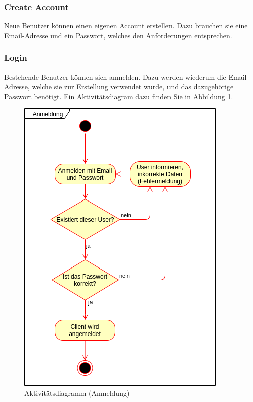 \documentclass[a4paper, titlepage]{article}
\begin{document}
    \subsubsection{Create Account}
    Neue Benutzer können einen eigenen Account erstellen. Dazu
    brauchen sie eine Email-Adresse und ein Passwort, welches
    den Anforderungen entsprechen.

    \subsubsection{Login}
    Bestehende Benutzer können sich anmelden. Dazu werden wiederum
    die Email-Adresse, welche sie zur Erstellung verwendet wurde,
    und das dazugehörige Passwort benötigt. Ein Aktivitätsdiagram
    dazu finden Sie in Abbildung \ref{activity}.

    \begin{figure}
        \begin{center}
            \includegraphics[width=\textwidth]{images/Aktivitaetsdiagramm.png}     
        \end{center}
        \caption{Aktivitätsdiagramm (Anmeldung)}
        \label{activity}
    \end{figure}
\end{document}
